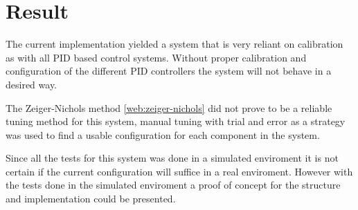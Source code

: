 \section{Result}\label{sec:result}

The current implementation yielded a system that is very reliant on calibration as with all PID based control systems. Without proper calibration and configuration of the different PID controllers the system will not behave in a desired way. 

The Zeiger-Nichols method \ref{web:zeiger-nichols}  did not prove to be a reliable tuning method for this system, manual tuning with trial and error as a strategy was used to find a usable configuration for each component in the system.

Since all the tests for this system was done in a simulated enviroment it is not certain if the current configuration will suffice in a real enviroment. However with the tests done in the simulated enviroment a proof of concept for the structure and implementation could be presented.
